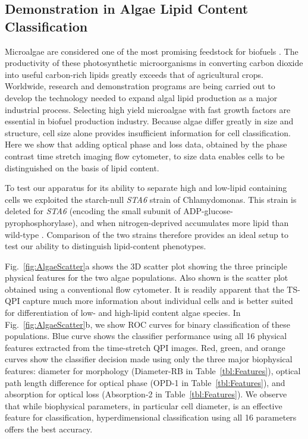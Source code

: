 \documentclass[aps,pra,reprint,superscriptaddress]{revtex4-1}
\begin{document}
\subsection{Demonstration in Algae Lipid Content Classification}

Microalgae are considered one of the most promising feedstock for biofuels \cite{merchant2012tag}. The productivity of these photosynthetic microorganisms in converting carbon dioxide into useful carbon-rich lipids greatly exceeds that of agricultural crops. Worldwide, research and demonstration programs are being carried out to develop the technology needed to expand algal lipid production as a major industrial process. Selecting high yield microalgae with fast growth factors are essential in biofuel production industry. Because algae differ greatly in size and structure, cell size alone provides insufficient information for cell classification. Here we show that adding optical phase and loss data, obtained by the phase contrast time stretch imaging flow cytometer, to size data enables cells to be distinguished on the basis of lipid content. 

To test our apparatus for its ability to separate high and low-lipid containing cells we exploited the starch-null \textit{STA6} strain of Chlamydomonas. This strain is deleted for \textit{STA6} \cite{zabawinski2001starchless} (encoding the small subunit of ADP-glucose-pyrophosphorylase), and when nitrogen-deprived accumulates more lipid than wild-type \cite{work2010increased, li2010chlamydomonas, goodenough2014path, blaby2013systems}. Comparison of the two strains therefore provides an ideal setup to test our ability to distinguish lipid-content phenotypes.

Fig.~\ref{fig:AlgaeScatter}a shows the 3D scatter plot showing the three principle physical features for the two algae populations. Also shown is the scatter plot obtained using a conventional flow cytometer. It is readily apparent that the TS-QPI capture much more information about individual cells and is better suited for differentiation of low- and high-lipid content algae species. In Fig.~\ref{fig:AlgaeScatter}b, we show ROC curves for binary classification of these populations. Blue curve shows the classifier performance using all 16 physical features extracted from the time-stretch QPI images. Red, green, and orange curves show the classifier decision made using only the three major biophysical features: diameter for morphology (Diameter-RB in Table~\ref{tbl:Features}), optical path length difference for optical phase (OPD-1 in Table~\ref{tbl:Features}), and absorption for optical loss (Absorption-2 in Table~\ref{tbl:Features}). We observe that while biophysical parameters, in particular cell diameter, is an effective feature for classification, hyperdimensional classification using all 16 parameters offers the best accuracy. 
\end{document}
